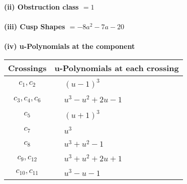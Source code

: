 \documentclass[1p]{elsarticle_modified}
\theoremstyle{definition}
\begin{document}
\flushleft \textbf{(ii) Obstruction class $= 1$}\\~\\
\flushleft \textbf{(iii) Cusp Shapes $= -8 a^2-7 a-20$}\\~\\
\newpage\renewcommand{\arraystretch}{1}
\flushleft \textbf{(iv) u-Polynomials at the component}\newline \\
\begin{tabular}{m{50pt}|m{274pt}}
Crossings & \hspace{64pt}u-Polynomials at each crossing \\
\hline $$\begin{aligned}c_{1},c_{2}\end{aligned}$$&$\begin{aligned}
&(u-1)^3
\end{aligned}$\\
\hline $$\begin{aligned}c_{3},c_{4},c_{6}\end{aligned}$$&$\begin{aligned}
&u^3- u^2+2 u-1
\end{aligned}$\\
\hline $$\begin{aligned}c_{5}\end{aligned}$$&$\begin{aligned}
&(u+1)^3
\end{aligned}$\\
\hline $$\begin{aligned}c_{7}\end{aligned}$$&$\begin{aligned}
&u^3
\end{aligned}$\\
\hline $$\begin{aligned}c_{8}\end{aligned}$$&$\begin{aligned}
&u^3+u^2-1
\end{aligned}$\\
\hline $$\begin{aligned}c_{9},c_{12}\end{aligned}$$&$\begin{aligned}
&u^3+u^2+2 u+1
\end{aligned}$\\
\hline $$\begin{aligned}c_{10},c_{11}\end{aligned}$$&$\begin{aligned}
&u^3- u-1
\end{aligned}$\\
\hline
\end{tabular}\\~\\
\end{document}
